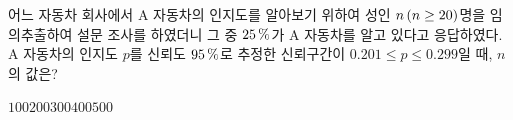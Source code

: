 어느 자동차 회사에서 A 자동차의 인지도를 알아보기 위하여 성인 $n\mkern3mu (n\ge 20)$명을 임의추출하여 설문 조사를 하였더니 그 중 $25\mkern3mu \%$가 A 자동차를 알고 있다고 응답하였다. A 자동차의 인지도 $p$를 신뢰도 $95\mkern3mu \%$로 추정한 신뢰구간이 $0.201\le p\le 0.299$일 때, $n$의 값은? 
\begin{choices32}{$100$}{$200$}{$300$}{$400$}{$500$}\end{choices32}

